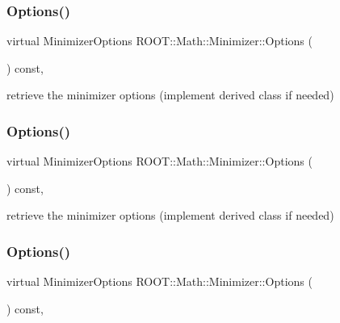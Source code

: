 \subsubsection{\texorpdfstring{Options()}{Options()}\hspace{0.1cm}{\footnotesize\ttfamily [1/3]}}
{\footnotesize\ttfamily virtual Minimizer\+Options R\+O\+O\+T\+::\+Math\+::\+Minimizer\+::\+Options (\begin{DoxyParamCaption}{ }\end{DoxyParamCaption}) const\hspace{0.3cm}{\ttfamily [inline]}, {\ttfamily [virtual]}}



retrieve the minimizer options (implement derived class if needed) 

\mbox{\label{classROOT_1_1Math_1_1Minimizer_a9b0653bcf3d2c0b4df79c1db2068ff27}} 
\subsubsection{\texorpdfstring{Options()}{Options()}\hspace{0.1cm}{\footnotesize\ttfamily [2/3]}}
{\footnotesize\ttfamily virtual Minimizer\+Options R\+O\+O\+T\+::\+Math\+::\+Minimizer\+::\+Options (\begin{DoxyParamCaption}{ }\end{DoxyParamCaption}) const\hspace{0.3cm}{\ttfamily [inline]}, {\ttfamily [virtual]}}



retrieve the minimizer options (implement derived class if needed) 

\mbox{\label{classROOT_1_1Math_1_1Minimizer_a9b0653bcf3d2c0b4df79c1db2068ff27}} 
\subsubsection{\texorpdfstring{Options()}{Options()}\hspace{0.1cm}{\footnotesize\ttfamily [3/3]}}
{\footnotesize\ttfamily virtual Minimizer\+Options R\+O\+O\+T\+::\+Math\+::\+Minimizer\+::\+Options (\begin{DoxyParamCaption}{ }\end{DoxyParamCaption}) const\hspace{0.3cm}{\ttfamily [inline]}, {\ttfamily [virtual]}}



